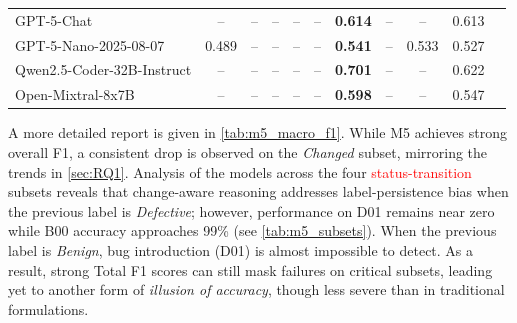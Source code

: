 \documentclass[authoryear,final,5p,times,twocolumn]{elsarticle}
\theoremstyle{plain}
\begin{document}
\begin{table}[!htbp]
{\begin{tabular}{lcccccccccc}
GPT-5-Chat
& -- & -- & -- & -- & -- & \cellcolor{gray!20}\textbf{0.614} & -- & -- & 0.613 \\

GPT-5-Nano-2025-08-07
& 0.489 & -- & -- & -- & -- & \cellcolor{gray!20}\textbf{0.541} & -- & 0.533 & 0.527 \\

Qwen2.5-Coder-32B-Instruct
& -- & -- & -- & -- & -- & \cellcolor{gray!20}\textbf{0.701} & -- & -- & 0.622 \\

Open-Mixtral-8x7B
& -- & -- & -- & -- & -- & \cellcolor{gray!20}\textbf{0.598} & -- & -- & 0.547 \\
\bottomrule
\end{tabular}
}
\end{table}
A more detailed report is given in \autoref{tab:m5_macro_f1}. While M5 achieves strong overall F1, a consistent drop is observed on the \emph{Changed} subset, mirroring the trends in \autoref{sec:RQ1}. 
Analysis of the models across the four \textcolor{red}{status-transition} subsets reveals that change-aware reasoning addresses label-persistence bias when the previous label is \emph{Defective}; however, performance on D01 remains near zero while B00 accuracy approaches 99\% (see \autoref{tab:m5_subsets}). When the previous label is \textit{Benign}, bug introduction (D01) is almost impossible to detect. As a result, strong Total F1 scores can still mask failures on critical subsets, leading yet to another form of \emph{illusion of accuracy}, though less severe than in traditional formulations.
\end{document}

